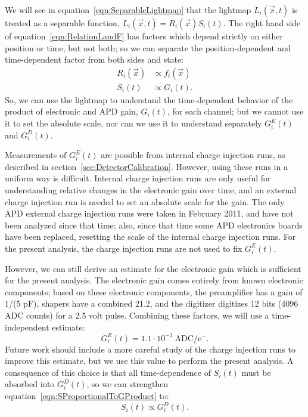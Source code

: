 We will see in equation~\ref{eqn:SeparableLightmap} that the lightmap $L_i(\vec{x},t)$ is treated as a separable function, $L_i(\vec{x},t) = R_i(\vec{x})S_i(t)$.  The right hand side of equation~\ref{eqn:RelationLandF} has factors which depend strictly on either position or time, but not both; so we can separate the position-dependent and time-dependent factor from both sides and state:
\begin{subequations}\begin{align}
R_i(\vec{x}) &\propto f_i(\vec{x}) \\
S_i(t) &\propto G_i(t).\label{eqn:SProportionalToGProduct}
\end{align}\end{subequations}
So, we can use the lightmap to understand the time-dependent behavior of the product of electronic and APD gain, $G_i(t)$, for each channel; but we cannot use it to set the absolute scale, nor can we use it to understand separately $G_i^E(t)$ and $G_i^D(t)$.

Measurements of $G^E_i(t)$ are possible from internal charge injection runs, as described in section~\ref{sec:DetectorCalibration}.  However, using these runs in a uniform way is difficult.  Internal charge injection runs are only useful for understanding relative changes in the electronic gain over time, and an external charge injection run is needed to set an absolute scale for the gain.  The only APD external charge injection runs were taken in February 2011, and have not been analyzed since that time; also, since that time some APD electronics boards have been replaced, resetting the scale of the internal charge injection runs.  For the present analysis, the charge injection runs are not used to fix $G^E_i(t)$.

However, we can still derive an estimate for the electronic gain which is sufficient for the present analysis.  The electronic gain comes entirely from known electronic components; based on these electronic components, the preamplifier has a gain of 1/(5 pF), shapers have a combined 21.2, and the digitizer digitizes 12 bits (4096 ADC counts) for a 2.5 volt pulse.  Combining these factors, we will use a time-independent estimate:
\begin{equation}\label{eqn:ApproxForGE}
G^E_i(t) = 1.1 \cdot 10^{-3}\:\text{ADC}/\text{e}^-.
\end{equation}
Future work should include a more careful study of the charge injection runs to improve this estimate, but we use this value to perform the present analysis.  A consequence of this choice is that all time-dependence of $S_i(t)$ must be absorbed into $G^D_i(t)$, so we can strengthen equation~\ref{eqn:SProportionalToGProduct} to:
\begin{equation}\label{eqn:S_propto_GD}
S_i(t) \propto G_i^D(t).
\end{equation}

